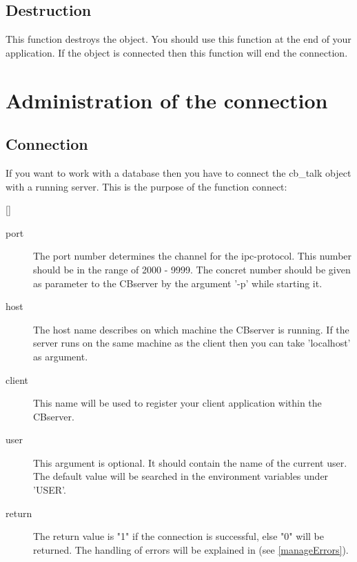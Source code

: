  \subsection{Destruction}
	\begin{method}{ } 
	This function destroys the object. 
	You should use this function at the end of your application.
	If the object is connected then this function will end the 
	 connection.
	\end{method}

\section{Administration of the connection}
 \subsection{Connection} 
  \label{tcl_connection}
	If you want to work with a database then you have to connect 
	 the cb\_talk object with a running server.
	This is the purpose of the function connect: \\
	\begin{method}{
		    
		 [] 
		}
	  \begin{description}	
	     \item[ port] The port number determines the channel for 
		the ipc-protocol. This number should be in the range of 
		2000 - 9999.
		The concret number should be given as parameter to the
		CBserver by the argument '-p' while starting it.
	     \item[ host] 
		The host name describes on which machine the CBserver 
		is running.
		If the server runs on the same machine as the client 
		then you can take 'localhost' as argument.
	     \item[ client] 
		This name will be used to register your client application
		within the CBserver.
	     \item[ user] This argument is optional. 
		It should contain the name of the current user. 
		The default value will be searched in
		the environment variables under 'USER'.
	     \item[ return]
		The return value is "1" if the connection is successful,
		else "0" will be returned.
		The handling of errors will be explained 
		in (see \ref{manageErrors}).
	  \end{description}
	\end{method}

